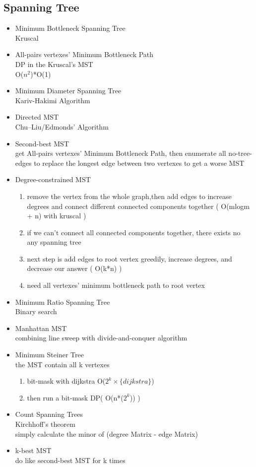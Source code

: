\subsection{Spanning Tree}
\begin{itemize}
\item Minimum Bottleneck Spanning Tree\\
Kruscal

\item All-pairs vertexes' Minimum Bottleneck Path\\
DP in the Kruscal's MST\\
O($n^2$)*O(1)

\item Minimum Diameter Spanning Tree\\
Kariv-Hakimi Algorithm

\item Directed MST\\
Chu–Liu/Edmonds' Algorithm

\item Second-best MST\\
get All-pairs vertexes' Minimum Bottleneck Path, then enumerate all no-tree-edges to replace the longest edge between two vertexes to get a worse MST

\item Degree-constrained MST
\begin{enumerate}
\item remove the vertex from the whole graph,then add edges to increase degrees and connect different connected components together ( O(mlogm + n) with kruscal )
\item if we can't connect all connected components together, there exists no any spanning tree
\item next step is add edges to root vertex greedily, increase degrees, and decrease our answer ( O(k*n) )
\item need all vertexes' minimum bottleneck path to root vertex
\end{enumerate}

\item Minimum Ratio Spanning Tree\\
Binary search

\item Manhattan MST\\
combining line sweep with divide-and-conquer algorithm

\item Minimum Steiner Tree\\
the MST contain all k vertexes
\begin{enumerate}
\item bit-mask with dijkstra O($2^k\times\{dijkstra\}$)
\item then run a bit-mask DP( O(n*($2^k$)) )
\end{enumerate}

\item Count Spanning Trees\\
Kirchhoff's theorem\\
simply calculate the minor of (degree Matrix - edge Matrix)

\item k-best MST\\
do like second-best MST for k times
\end{itemize}
